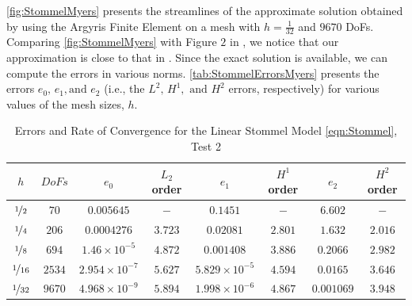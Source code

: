 \autoref{fig:StommelMyers} presents the streamlines of the approximate solution
obtained by using the Argyris Finite Element on a mesh with $h=\frac{1}{32}$ and
$9670$ DoFs. Comparing \autoref{fig:StommelMyers} with Figure $2$ in
\cite{Myers}, we notice that our approximation is close to that in \cite{Myers}.
Since the exact solution is available, we can compute the errors in various
norms. \autoref{tab:StommelErrorsMyers} presents the errors $e_0,\, e_1, \text{
and } e_2$ (i.e., the $L^2,\, H^1, \text{ and } H^2$ errors, respectively) for
various values of the mesh sizes, $h$.

\begin{table}%
\begin{center}
\begin{tabular}{|c|c|c|c|c|c|c|c|}%
  \hline
  $h$ & $DoFs$ & $e_0$ & $L_2$ order & $e_1$ & $H^1$ order & $e_2$ & $H^2$ order \\[0.2em] %
  \hline
  $\nicefrac{1}{2}$ & $70$ & $0.005645$ & $-$ & $0.1451$ & $-$ & $6.602$ & $-$ \\[0.2em] %
  $\nicefrac{1}{4}$ & $206$ & $0.0004276$ & $3.723$ & $0.02081$ & $2.801$ & $1.632$ & $2.016$ \\[0.2em] %
  $\nicefrac{1}{8}$ & $694$ & $1.46\times 10^{-5}$ & $4.872$ & $0.001408$ & $3.886$ & $0.2066$ & $2.982$ \\[0.2em] %
  $\nicefrac{1}{16}$ & $2534$ & $2.954\times 10^{-7}$ & $5.627$ & $5.829\times 10^{-5}$ & $4.594$ & $0.0165$ & $3.646$ \\[0.2em] %
  $\nicefrac{1}{32}$ & $9670$ & $4.968\times 10^{-9}$ & $5.894$ & $1.998\times 10^{-6}$ & $4.867$ & $0.001069$ & $3.948$ \\[0.2em] %
  \hline
\end{tabular}
\end{center}
\caption{Errors and Rate of Convergence for the Linear Stommel Model \eqref{eqn:Stommel}, Test 2 \cite{Myers}}
\label{tab:StommelErrorsMyers}
\end{table}

